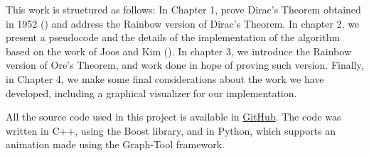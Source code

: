 This work is structured as follows: In Chapter 1, prove Dirac's Theorem obtained in 1952 (\cite{dirac1952}) and address the Rainbow version of Dirac's 
Theorem. In chapter 2, we present a pseudocode and the details of the implementation of the algorithm based on the work of Joos and Kim (\cite{Joos_2020}). 
In chapter 3, we introduce the Rainbow version of Ore's Theorem, and work done in hope of proving such version.
Finally, in Chapter 4, we make some final considerations about the work we have developed, including a graphical visualizer for our implementation.

All the source code used in this project is available in \href{https://github.com/wmrmrx/TCC}{GitHub}. The code was written in C++, using the Boost 
library, and in Python, which supports an animation made using the Graph-Tool framework.





